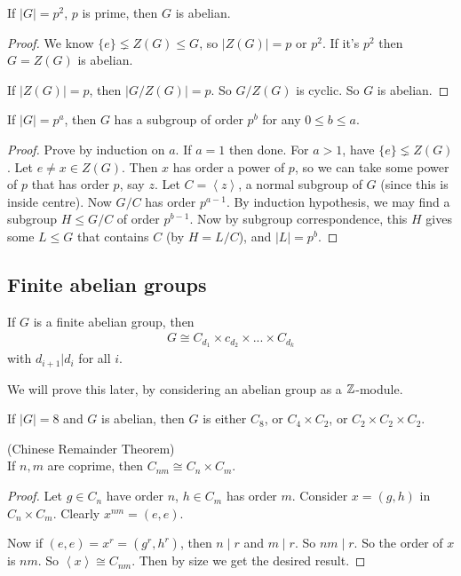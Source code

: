 \documentclass[a4paper]{article}
\begin{document}
\begin{coro}
If $|G| = p^2$, $p$ is prime, then $G$ is abelian.
\begin{proof}
We know $\{e\} \lneq Z(G) \leq G$, so $|Z(G)| = p$ or $p^2$. If it's $p^2$ then $G=Z(G)$ is abelian.

If $|Z(G)| = p$, then $|G/Z(G)| = p$. So $G/Z(G)$ is cyclic. So $G$ is abelian.
\end{proof}
\end{coro}

\begin{thm} 
If $|G| = p^a$, then $G$ has a subgroup of order $p^b$ for any $0 \leq b \leq a$.
\begin{proof}
Prove by induction on $a$. If $a=1$ then done. For $a>1$, have $\{e\} \lneq Z(G)$. Let $e \neq x \in Z(G)$. Then $x$ has order a power of $p$, so we can take some power of $p$ that has order $p$, say $z$. Let $C=\left<z\right>$, a normal subgroup of $G$ (since this is inside centre). 
Now $G/C$ has order $p^{a-1}$. By induction hypothesis, we may find a subgroup $H \leq G/C$ of order $p^{b-1}$. Now by subgroup correspondence, this $H$ gives some $L\leq G$ that contains $C$ (by $H =L/C$), and $|L| = p^b$.
\end{proof}
\end{thm}

\subsection{Finite abelian groups}
\begin{thm}
If $G$ is a finite abelian group, then
\begin{equation*}
\begin{aligned}
G \cong C_{d_1} \times c_{d_2} \times ... \times C_{d_k}
\end{aligned}
\end{equation*}
with $d_{i+1} | d_i$ for all $i$.

We will prove this later, by considering an abelian group as a $\mathbb{Z}$-module.
\end{thm}

\begin{eg}
If $|G|=8$ and $G$ is abelian, then $G$ is either $C_8$, or $C_4 \times C_2$, or $C_2 \times C_2 \times C_2$.
\end{eg}

\begin{lemma} (Chinese Remainder Theorem)\\
If $n,m$ are coprime, then $C_{nm} \cong C_n \times C_m$.
\begin{proof}
Let $g \in C_n$ have order $n$, $h \in C_m$ has order $m$. Consider $x = (g,h)$ in $C_n \times C_m$. Clearly $x^{nm} = (e,e)$.

Now if $(e,e) = x^r = (g^r,h^r)$, then $n \mid r$ and $m \mid r$. So $nm \mid r$. So the order of $x$ is $nm$. So $\left<x\right> \cong C_{nm}$. Then by size we get the desired result.
\end{proof}
\end{lemma}
\end{document}
